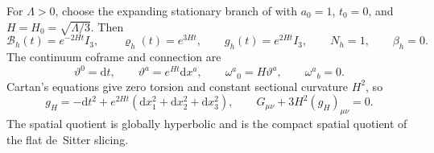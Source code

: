 \documentclass[11pt]{article}
\theoremstyle{definition}
\theoremstyle{remark}
\newcommand{\dd}{\mathrm d}
\begin{document}
For $\Lambda>0$, choose the expanding stationary branch of
 with $a_0=1$, $t_0=0$, and
$H=H_0=\sqrt{\Lambda/3}$.  Then
\begin{equation}
 \mathcal B_h(t)=e^{-2Ht}I_3,
 \qquad
 \varrho_h(t)=e^{3Ht},
 \qquad
 g_h(t)=e^{2Ht}I_3,
 \qquad
 N_h=1,
 \qquad
 \beta_h=0.
 \label{eq:desitter-adm-main}
\end{equation}
The continuum coframe and connection are
\begin{equation}
 \vartheta^0=\dd t,
 \qquad
 \vartheta^a=e^{Ht}\dd x^a,
 \qquad
 \omega^a{}_0=H\vartheta^a,
 \qquad
 \omega^a{}_b=0.
 \label{eq:desitter-cartan-main}
\end{equation}
Cartan's equations give zero torsion and constant sectional curvature $H^2$,
so
\begin{equation}
 \boxed{
 g_H=-\dd t^2+e^{2Ht}
 (\dd x_1^2+\dd x_2^2+\dd x_3^2),
 \qquad
 G_{\mu\nu}+3H^2(g_H)_{\mu\nu}=0.}
 \label{eq:desitter-einstein-main}
\end{equation}
The spatial quotient is globally hyperbolic and is the compact spatial quotient
of the flat de~Sitter slicing.
\end{document}
